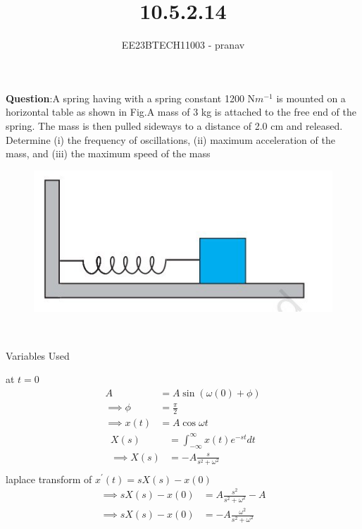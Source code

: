 \documentclass[journal,12pt,twocolumn]{IEEEtran}
\theoremstyle{remark}
\begin{document}

\vspace{3cm}

\title{10.5.2.14}
\author{EE23BTECH11003 - pranav}
\maketitle
\newpage

\bigskip
\renewcommand{\thefigure}{\arabic{figure}}
\renewcommand{\thetable}{\arabic{table}}

\textbf{Question}:A spring having with a spring constant 1200 N$m^{-1}$ is mounted on a horizontal
table as shown in Fig.A mass of 3 kg is attached to the free end of the
spring. The mass is then pulled sideways to a distance of 2.0 cm and released.\\
Determine (i) the frequency of oscillations, (ii) maximum acceleration of the mass,
and (iii) the maximum speed of the mass
\begin{figure}[h!]
    \centering
    \includegraphics[width=0.5\linewidth]{figs/figure.jpg}
    \caption{ }
    
\end{figure}\\
\solution
\begin{table}[h!]
    \centering
    
    \caption{Variables Used}
\end{table}
at $t=0$
\begin{align}
A&=A\sin{(\omega(0)+\phi)}\\
\implies \phi&=\frac{\pi}{2}\\
\implies x(t)&=A\cos{\omega t} 
\end{align}
\begin{align}
X(s)&=\int_{-\infty}^{\infty} x(t)e^{-st}dt \\
\implies X(s)&=-A\frac{s}{s^2+\omega^2}\\
\end{align}
laplace transform of $x^{'}(t)=sX(s)-x(0)$
\begin{align}
 \implies sX(s)-x(0)&=A\frac{s^2}{s^2+\omega^2}-A\\
 \implies sX(s)-x(0)&=-A\frac{\omega^2}{s^2+\omega^2}\\
\end{align}
\end{document}

